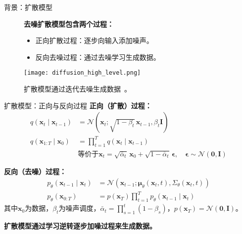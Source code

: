   \begin{refsection}
  \begin{frame}{背景：扩散模型}
  
    \begin{figure}
      \begin{minipage}{0.95\linewidth}
        \footnotesize
        \textbf{去噪扩散模型包含两个过程：}
        \begin{itemize}
          \item 正向扩散过程：逐步向输入添加噪声。
          \item 反向去噪过程：通过去噪学习生成数据。
        \end{itemize}
      \end{minipage}
      \vspace{2em}
  
      \centering
      \texttt{[image: diffusion\_high\_level.png]}
  
      \caption[]{\scriptsize 扩散模型通过迭代去噪生成数据~\parencite{sohl2015deep,ho2020denoising}。}
    \end{figure}
  
    \bottomleftrefs
  \end{frame}
  \end{refsection}
  
  \begin{refsection}
  \begin{frame}{扩散模型：正向与反向过程}
    \footnotesize
    \textbf{正向（扩散）过程：}
    \begin{align*}
      q(\mathbf{x}_t \mid \mathbf{x}_{t-1}) &= \mathcal{N}(\mathbf{x}_t; \sqrt{1-\beta_t}\,\mathbf{x}_{t-1}, \beta_t \mathbf{I}) \\
      q(\mathbf{x}_{1:T} \mid \mathbf{x}_0) &= \prod_{t=1}^T q(\mathbf{x}_t \mid \mathbf{x}_{t-1}) \\
      &\text{等价于} 
      \mathbf{x}_t = \sqrt{\bar{\alpha}_t}\,\mathbf{x}_0 + \sqrt{1-\bar{\alpha}_t}\,\boldsymbol{\epsilon}, \quad \boldsymbol{\epsilon} \sim \mathcal{N}(\mathbf{0}, \mathbf{I})
    \end{align*}
  
    \footnotesize
    \textbf{反向（去噪）过程：}
    \begin{align*}
      p_\theta(\mathbf{x}_{t-1} \mid \mathbf{x}_t) &= \mathcal{N}(\mathbf{x}_{t-1}; \boldsymbol{\mu}_\theta(\mathbf{x}_t, t), \Sigma_\theta(\mathbf{x}_t, t)) \\
      p_\theta(\mathbf{x}_{0:T}) &= p(\mathbf{x}_T) \prod_{t=1}^T p_\theta(\mathbf{x}_{t-1} \mid \mathbf{x}_t)
    \end{align*}
    \scriptsize
    其中$\mathbf{x}_0$为数据，$\beta_t$为噪声调度，$\bar{\alpha}_t = \prod_{s=1}^t (1-\beta_s)$，$p(\mathbf{x}_T) = \mathcal{N}(\mathbf{0}, \mathbf{I})$。
  
    \scriptsize
    \textbf{扩散模型通过学习逆转逐步加噪过程来生成数据。}~\parencite{sohl2015deep,ho2020denoising}
    \bottomleftrefs
  \end{frame}
  \end{refsection}
  
